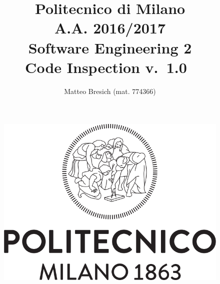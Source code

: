 \documentclass{article}
\newcommand{\version}{\mbox{\normalfont v. 1.0 }}
\begin{document}
	\title{Politecnico di Milano\\A.A. 2016/2017\\Software Engineering 2\\ \bigskip \textbf{C}ode \textbf{I}nspection \version}
	\author{Matteo Bresich (mat. 774366)}
	
	
	
	\begin{figure}[t]
		\centering
		\includegraphics[width=\linewidth]{"img/logo-polimi"}
		\label{fig:polimi-logo}
	\end{figure}

	\maketitle
	
	\thispagestyle{empty}
	\clearpage\mbox{}\thispagestyle{empty}\clearpage
	
	\renewcommand*\thesection{\arabic{section}}
	\renewcommand*\thesubsection{\arabic{section}.\arabic{subsection}}
	\renewcommand*\thesubsubsection{%
		\arabic{section}.\arabic{subsection}.\arabic{subsubsection}%
	}
	\setcounter{secnumdepth}{4}
	\setcounter{tocdepth}{4}
	
	\renewcommand{\contentsname}{Table of Content}
	\tableofcontents
	
	\newpage
	
\end{document}

